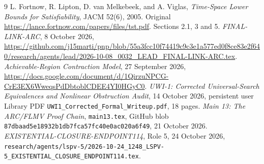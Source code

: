 \documentclass[11pt]{article}
\begin{document}
\begin{thebibliography}{9}
 L. Fortnow, R. Lipton, D. van Melkebeek, and A. Viglas, \emph{Time-Space Lower Bounds for Satisfiability}, JACM 52(6), 2005. Original \url{https://lance.fortnow.com/papers/files/tst.pdf}. Sections 2.1, 3 and 5.
 \emph{FINAL-LINK-ARC}, 8 October 2026, \url{https://github.com/j15marti/pnp/blob/55a3fcc10f74419c9c3e1a577ed0f8ce83e2f640/research/agents/lead/2026-10-08_0032_LEAD_FINAL-LINK-ARC.tex}.
 \emph{Achievable-Region Contraction Model}, 27 September 2026, \url{https://docs.google.com/document/d/1QirzuNPCG-CrE3EX6WweqsPdDbtoblCDEE4YI0HGyC0}.
 \emph{UWI-1: Corrected Universal-Search Equivalences and Nonlinear Obstruction Audit}, 14 October 2026, persistent user Library PDF \texttt{UWI1\_Corrected\_Formal\_Writeup.pdf}, 18 pages.
 \emph{Main 13: The ARC/FLMV Proof Chain}, \texttt{main13.tex}, GitHub blob \texttt{87dbaad5e18932b1db7fca57fc40e0ac020a6f49}, 21 October 2026.
 \emph{EXISTENTIAL-CLOSURE-ENDPOINT114}, Role 5, 24 October 2026, \texttt{research/agents/lspv-5/2026-10-24\_1248\_LSPV-5\_EXISTENTIAL\_CLOSURE\_ENDPOINT114.tex}.
\end{thebibliography}
\end{document}
